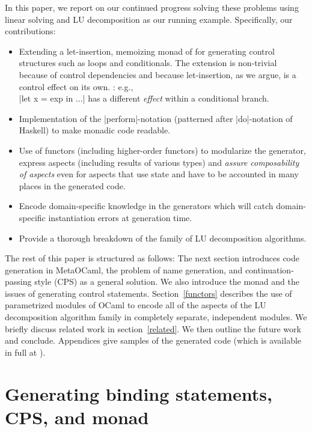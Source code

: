 \documentclass[draft]{elsart}
\begin{document}
In this paper, we report on our continued progress \cite{CaretteKiselyov05}
solving these problems using linear solving and LU decomposition
as our running example. Specifically, our contributions:
\begin{itemize}
    \item Extending a let-insertion, memoizing monad of
      \cite{MSP:PADL04,KiselyovTaha} for generating control structures
      such as loops and conditionals. The extension is non-trivial
      because of control dependencies and because
      let-insertion, as we argue, is a control effect on its own.
      : e.g.,\\
      |let x = exp in ...| has a different \emph{effect} within a
      conditional branch.
    \item Implementation of the |perform|-notation (patterned after
      |do|-notation of Haskell) to make monadic code readable.
    \item Use of functors (including higher-order functors) to
      modularize the generator, express aspects (including results of
      various types) and \emph{assure composability of aspects} even
      for aspects that use state and have to be accounted in many
      places in the generated code.
    \item Encode domain-specific knowledge in the generators which 
      will catch domain-specific instantiation errors at generation
      time.
    \item Provide a thorough breakdown of the family of LU decomposition
      algorithms.
\end{itemize}

The rest of this paper is structured as follows: The next section
introduces code generation in MetaOCaml, the problem of name
generation, and continuation-passing style (CPS) as a general
solution.  We also introduce the monad and the issues of generating
control statements. Section~\ref{functors} describes the use of
parametrized modules of OCaml to encode all of the aspects of the
LU decomposition algorithm family in completely separate,
independent modules.  We briefly discuss related work in
section~\ref{related}. We then outline the future work and conclude.
Appendices give samples of the generated code (which is available in
full at \cite{metamonadsURL}).


\section{Generating binding statements, CPS, and monad}\label{CPS}
\end{document}
